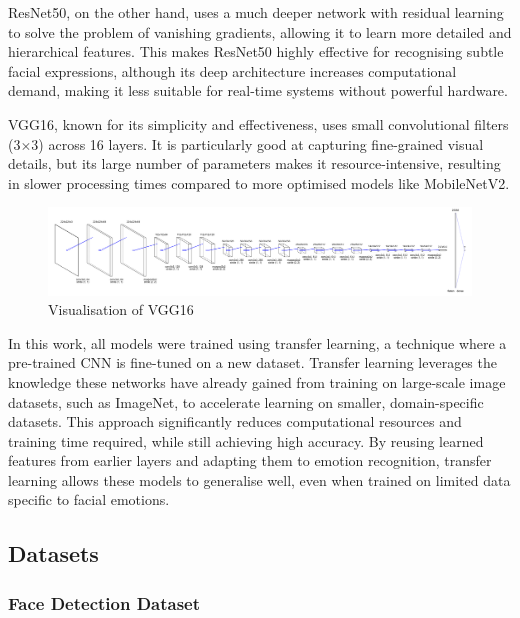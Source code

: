 ResNet50, on the other hand, uses a much deeper network with residual learning to solve the problem of vanishing gradients, allowing it to learn more detailed and hierarchical features. This makes ResNet50 highly effective for recognising subtle facial expressions, although its deep architecture increases computational demand, making it less suitable for real-time systems without powerful hardware.

VGG16, known for its simplicity and effectiveness, uses small convolutional filters (3\(\times\)3) across 16 layers. It is particularly good at capturing fine-grained visual details, but its large number of parameters makes it resource-intensive, resulting in slower processing times compared to more optimised models like MobileNetV2.

\begin{figure}[!htb]
    \centering{}
    \includegraphics[scale=0.15]{m+m_images/VGG16.png}
    \caption{Visualisation of VGG16}
    \label{figure:vggresnetmobilenet}
\end{figure}

In this work, all models were trained using transfer learning, a technique where a pre-trained CNN is fine-tuned on a new dataset. Transfer learning leverages the knowledge these networks have already gained from training on large-scale image datasets, such as ImageNet, to accelerate learning on smaller, domain-specific datasets. This approach significantly reduces computational resources and training time required, while still achieving high accuracy. By reusing learned features from earlier layers and adapting them to emotion recognition, transfer learning allows these models to generalise well, even when trained on limited data specific to facial emotions.

\subsection{Datasets}

\subsubsection{Face Detection Dataset}

